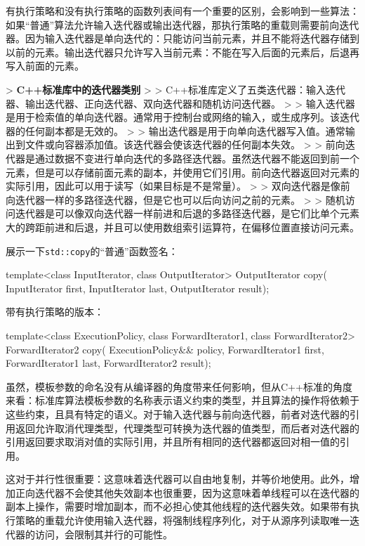 有执行策略和没有执行策略的函数列表间有一个重要的区别，会影响到一些算法：如果“普通”算法允许输入迭代器或输出迭代器，那执行策略的重载则需要前向迭代器。因为输入迭代器是单向迭代的：只能访问当前元素，并且不能将迭代器存储到以前的元素。输出迭代器只允许写入当前元素：不能在写入后面的元素后，后退再写入前面的元素。

> \textbf{C++标准库中的迭代器类别}
>
> C++标准库定义了五类迭代器：输入迭代器、输出迭代器、正向迭代器、双向迭代器和随机访问迭代器。
>
> 输入迭代器是用于检索值的单向迭代器。通常用于控制台或网络的输入，或生成序列。该迭代器的任何副本都是无效的。
>
> 输出迭代器是用于向单向迭代器写入值。通常输出到文件或向容器添加值。该迭代器会使该迭代器的任何副本失效。
>
> 前向迭代器是通过数据不变进行单向迭代的多路径迭代器。虽然迭代器不能返回到前一个元素，但是可以存储前面元素的副本，并使用它们引用。前向迭代器返回对元素的实际引用，因此可以用于读写（如果目标是不是常量）。
>
> 双向迭代器是像前向迭代器一样的多路径迭代器，但是它也可以后向访问之前的元素。
>
> 随机访问迭代器是可以像双向迭代器一样前进和后退的多路径迭代器，是它们比单个元素大的跨距前进和后退，并且可以使用数组索引运算符，在偏移位置直接访问元素。

展示一下\texttt{std::copy}的“普通”函数签名：

\begin{cpp}
template<class InputIterator, class OutputIterator>
OutputIterator copy(
  InputIterator first, InputIterator last, OutputIterator result);
\end{cpp}

带有执行策略的版本：

\begin{cpp}
template<class ExecutionPolicy,
  class ForwardIterator1, class ForwardIterator2>
ForwardIterator2 copy(
  ExecutionPolicy&& policy,
  ForwardIterator1 first, ForwardIterator1 last,
  ForwardIterator2 result);
\end{cpp}

虽然，模板参数的命名没有从编译器的角度带来任何影响，但从C++标准的角度来看：标准库算法模板参数的名称表示语义约束的类型，并且算法的操作将依赖于这些约束，且具有特定的语义。对于输入迭代器与前向迭代器，前者对迭代器的引用返回允许取消代理类型，代理类型可转换为迭代器的值类型，而后者对迭代器的引用返回要求取消对值的实际引用，并且所有相同的迭代器都返回对相一值的引用。

这对于并行性很重要：这意味着迭代器可以自由地复制，并等价地使用。此外，增加正向迭代器不会使其他失效副本也很重要，因为这意味着单线程可以在迭代器的副本上操作，需要时增加副本，而不必担心使其他线程的迭代器失效。如果带有执行策略的重载允许使用输入迭代器，将强制线程序列化，对于从源序列读取唯一迭代器的访问，会限制其并行的可能性。

